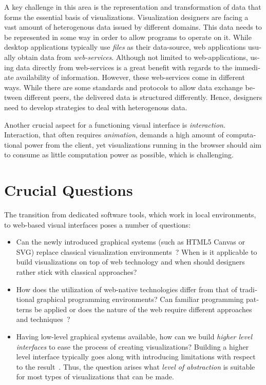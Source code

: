\begin{english}
A key challenge in this area is the representation and transformation of data that forms the essential basis of visualizations. Visualization designers are facing a vast amount of heterogenous data issued by different domains. This data needs to be represented in some way in order to allow programs to operate on it. While desktop applications typically use \emph{files} as their data-source, web applications usually obtain data from \emph{web-services}. Although not limited to web-applications, using data directly from web-services is a great benefit with regards to the immediate availability of information. However, these web-services come in different ways. While there are some standards and protocols to allow data exchange between different peers, the delivered data is structured differently. Hence, designers need to develop strategies to deal with heterogenous data.

Another crucial aspect for a functioning visual interface is \emph{interaction}. Interaction, that often requires \emph{animation}, demands a high amount of computational power from the client, yet visualizations running in the browser should aim to consume as little computation power as possible, which is challenging.

\section{Crucial Questions}

The transition from dedicated software tools, which work in local environments, to web-based visual interfaces poses a number of questions:

\begin{itemize}
  \item Can the newly introduced graphical systems (such as HTML5 Canvas or SVG) replace classical visualization environments~\cite{Johnson08}? When is it applicable to build visualizations on top of web technology and when should designers rather stick with classical approaches?
  
  \item How does the utilization of web-native technologies differ from that of traditional graphical programming environments? Can familiar programming patterns be applied or does the nature of the web require different approaches and techniques~\cite{Crockford:2008}?
  
  \item Having low-level graphical systems available, how can we build \emph{higher level interfaces} to ease the process of creating visualizations? Building a higher level interface typically goes along with introducing limitations with respect to the result~\cite{Protovis09}. Thus, the question arises what \emph{level of abstraction} is suitable for most types of visualizations that can be made.
  

\end{itemize}
\end{english}
